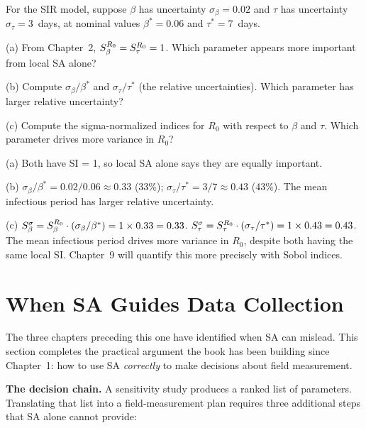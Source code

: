 \begin{selfcheck}
For the SIR model, suppose $\beta$ has uncertainty $\sigma_\beta = 0.02$
and $\tau$ has uncertainty $\sigma_\tau = 3$~days, at nominal values
$\beta^* = 0.06$ and $\tau^* = 7$~days.

(a) From Chapter~2, $S_{\beta}^{R_0} = S_{\tau}^{R_0} = 1$.
   Which parameter appears more important from local SA alone?

(b) Compute $\sigma_\beta/\beta^*$ and $\sigma_\tau/\tau^*$ (the relative uncertainties).
   Which parameter has larger relative uncertainty?

(c) Compute the sigma-normalized indices for $R_0$ with respect to
    $\beta$ and $\tau$. Which parameter drives more variance in $R_0$?
\end{selfcheck}
\begin{scAnswer}
(a) Both have SI = 1, so local SA alone says they are equally important.

(b) $\sigma_\beta/\beta^* = 0.02/0.06 \approx 0.33$ (33\%);
$\sigma_\tau/\tau^* = 3/7 \approx 0.43$ (43\%). The mean infectious
period has larger relative uncertainty.

(c) $S_\beta^\sigma = S_{\beta}^{R_0} \cdot (\sigma_\beta/\beta^*) = 1 \times 0.33 = 0.33$.
$S_\tau^\sigma = S_{\tau}^{R_0} \cdot (\sigma_\tau/\tau^*) = 1 \times 0.43 = 0.43$.
The mean infectious period drives more variance in $R_0$, despite both
having the same local SI. Chapter~9 will quantify this more precisely
with Sobol indices.
\end{scAnswer}

\section{When SA Guides Data Collection}
\label{sec:ch8datacollection}

The three chapters preceding this one have identified when SA
can mislead. This section completes the practical argument
the book has been building since Chapter~1: how to use SA
\emph{correctly} to make decisions about field measurement.

\textbf{The decision chain.}
A sensitivity study produces a ranked list of parameters.
Translating that list into a field-measurement plan requires
three additional steps that SA alone cannot provide:

